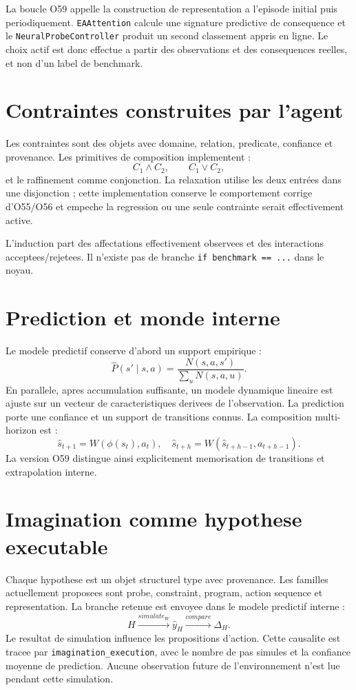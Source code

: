 \documentclass[11pt,a4paper]{article}
\begin{document}
La boucle O59 appelle la construction de representation a l'episode initial puis periodiquement. \texttt{EAAttention} calcule une signature predictive de consequence et le \texttt{NeuralProbeController} produit un second classement appris en ligne. Le choix actif est donc effectue a partir des observations et des consequences reelles, et non d'un label de benchmark.

\section{Contraintes construites par l'agent}
Les contraintes sont des objets avec domaine, relation, predicate, confiance et provenance. Les primitives de composition implementent :
\[
C_1\wedge C_2,\qquad C_1\vee C_2,
\]
et le raffinement comme conjonction. La relaxation utilise les deux entrées dans une disjonction ; cette implementation conserve le comportement corrige d'O55/O56 et empeche la regression ou une seule contrainte serait effectivement active.

L'induction part des affectations effectivement observees et des interactions acceptees/rejetees. Il n'existe pas de branche \texttt{if benchmark == ...} dans le noyau.

\section{Prediction et monde interne}
Le modele predictif conserve d'abord un support empirique :
\[
\widehat P(s'\mid s,a)=\frac{N(s,a,s')}{\sum_uN(s,a,u)}.
\]
En parallele, apres accumulation suffisante, un modele dynamique lineaire est ajuste sur un vecteur de caracteristiques derivees de l'observation. La prediction porte une confiance et un support de transitions connus. La composition multi-horizon est :
\[
\hat s_{t+1}=W(\phi(s_t),a_t),\quad \hat s_{t+h}=W(\hat s_{t+h-1},a_{t+h-1}).
\]
La version O59 distingue ainsi explicitement memorisation de transitions et extrapolation interne.

\section{Imagination comme hypothese executable}
Chaque hypothese est un objet structurel type avec provenance. Les familles actuellement proposees sont probe, constraint, program, action sequence et representation. La branche retenue est envoyee dans le modele predictif interne :
\[
H\xrightarrow{simulate_W}\widehat y_H\xrightarrow{compare}\Delta_H.
\]
Le resultat de simulation influence les propositions d'action. Cette causalite est tracee par \texttt{imagination\_execution}, avec le nombre de pas simules et la confiance moyenne de prediction. Aucune observation future de l'environnement n'est lue pendant cette simulation.
\end{document}
